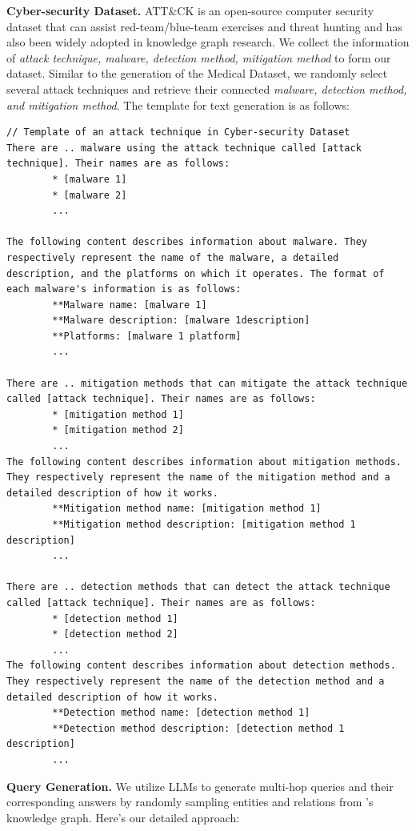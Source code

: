 {\bf Cyber-security Dataset.} ATT\&CK is an open-source computer security dataset that can assist red-team/blue-team exercises and threat hunting and has also been widely adopted in knowledge graph research. We collect the information of \emph{attack technique, malware, detection method, mitigation method} to form our dataset. Similar to the generation of the Medical Dataset, we randomly select several attack techniques and retrieve their connected \emph{malware, detection method, and mitigation method}. The template for text generation is as follows:
\begin{lstlisting}
// Template of an attack technique in Cyber-security Dataset
There are .. malware using the attack technique called [attack technique]. Their names are as follows:
        * [malware 1]
        * [malware 2]
        ...

The following content describes information about malware. They respectively represent the name of the malware, a detailed description, and the platforms on which it operates. The format of each malware's information is as follows:
        **Malware name: [malware 1]
        **Malware description: [malware 1description]
        **Platforms: [malware 1 platform]
        ...
    
There are .. mitigation methods that can mitigate the attack technique called [attack technique]. Their names are as follows:
        * [mitigation method 1]
        * [mitigation method 2]
        ...
The following content describes information about mitigation methods. They respectively represent the name of the mitigation method and a detailed description of how it works.
        **Mitigation method name: [mitigation method 1] 
        **Mitigation method description: [mitigation method 1 description]
        ...

There are .. detection methods that can detect the attack technique called [attack technique]. Their names are as follows:
        * [detection method 1]
        * [detection method 2]
        ...
The following content describes information about detection methods. They respectively represent the name of the detection method and a detailed description of how it works.
        **Detection method name: [detection method 1] 
        **Detection method description: [detection method 1 description]
        ...
\end{lstlisting}

{\bf Query Generation.} We utilize LLMs to generate multi-hop queries and their corresponding answers by randomly sampling entities and relations from \rag's knowledge graph. Here's our detailed approach:


